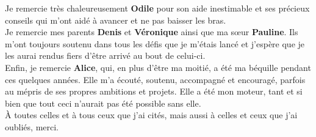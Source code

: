 Je remercie très chaleureusement \textbf{Odile} pour son aide inestimable et ses
précieux conseils qui m'ont aidé à avancer et ne pas baisser les bras.\\

Je remercie mes parents \textbf{Denis} et \textbf{Véronique} ainsi que ma sœur
\textbf{Pauline}. Ils m'ont toujours soutenu dans tous les défis que je m'étais
lancé et j'espère que je les aurai rendus fiers d'être arrivé au bout de
celui-ci.\\

Enfin, je remercie \textbf{Alice}, qui, en plus d'être ma moitié, a été ma
béquille pendant ces quelques années. Elle m'a écouté, soutenu, accompagné et
encouragé, parfois au mépris de ses propres ambitions et projets. Elle a été mon
moteur, tant et si bien que tout ceci n'aurait pas été possible sans elle.\\

À toutes celles et à tous ceux que j'ai cités, mais aussi à celles et ceux que
j'ai oubliés, merci. \\
